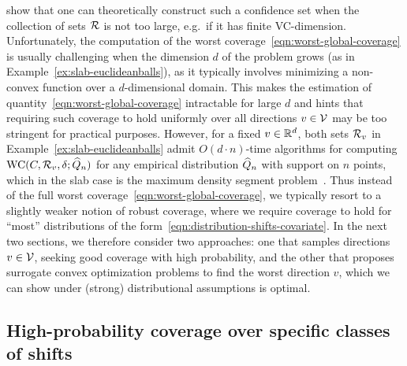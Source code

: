 \citet{BarberCaRaTi19a} show that one can theoretically construct such a
confidence set when the collection of sets $\mathcal{R}$ is not too large,
e.g.\ if it has finite VC-dimension.  Unfortunately, the computation of the
worst coverage~\eqref{eqn:worst-global-coverage} is usually challenging when
the dimension $d$ of the problem grows (as in
Example~\ref{ex:slab-euclideanballs}), as it typically involves
minimizing a non-convex function over a $d$-dimensional domain.  This makes
the estimation of quantity~\eqref{eqn:worst-global-coverage} intractable for
large $d$ and hints that requiring such coverage to hold uniformly
over all directions $v \in \mathcal{V}$ may be too stringent for practical
purposes.  However, for a fixed $v \in \mathbb{R}^d$, both sets $\mathcal{R}_v$ in
Example~\ref{ex:slab-euclideanballs} admit $O(d \cdot n)$-time algorithms
for computing $\textup{WC}(C, \mathcal{R}_v, \delta; \widehat{Q}_n)$ for any
empirical distribution $\widehat{Q}_n$ with support on $n$ points, which in the
slab case is the maximum density segment problem~\cite{ChungLu03}. Thus
instead of the full worst coverage~\eqref{eqn:worst-global-coverage}, we
typically resort to a slightly weaker notion of robust coverage, where we
require coverage to hold for ``most'' distributions of the
form~\eqref{eqn:distribution-shifts-covariate}.  In the next two sections,
we therefore consider two approaches: one that samples directions $v \in
\mathcal{V}$, seeking good coverage with high probability, and the other that
proposes surrogate convex optimization problems to find the worst direction
$v$, which we can show under (strong) distributional assumptions is optimal.


\subsection{High-probability coverage over specific classes of shifts}
\label{sec:coverage-high-probability-over-shifts}

